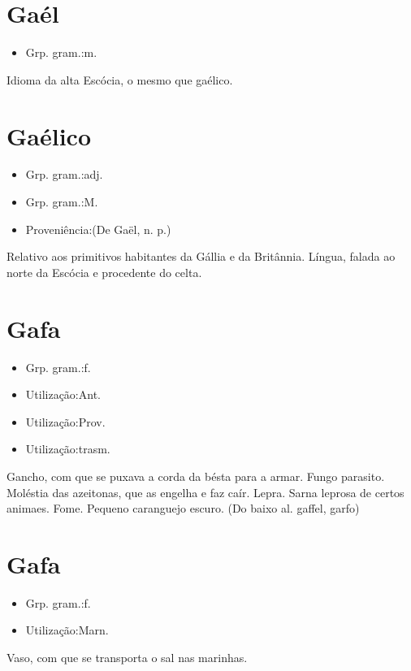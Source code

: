 \section{Gaél}
\begin{itemize}
\item {Grp. gram.:m.}
\end{itemize}
Idioma da alta Escócia, o mesmo que \textunderscore gaélico\textunderscore .
\section{Gaélico}
\begin{itemize}
\item {Grp. gram.:adj.}
\end{itemize}
\begin{itemize}
\item {Grp. gram.:M.}
\end{itemize}
\begin{itemize}
\item {Proveniência:(De \textunderscore Gaël\textunderscore , n. p.)}
\end{itemize}
Relativo aos primitivos habitantes da Gállia e da Britânnia.
Língua, falada ao norte da Escócia e procedente do celta.
\section{Gafa}
\begin{itemize}
\item {Grp. gram.:f.}
\end{itemize}
\begin{itemize}
\item {Utilização:Ant.}
\end{itemize}
\begin{itemize}
\item {Utilização:Prov.}
\end{itemize}
\begin{itemize}
\item {Utilização:trasm.}
\end{itemize}
Gancho, com que se puxava a corda da bésta para a armar.
Fungo parasito.
Moléstia das azeitonas, que as engelha e faz caír.
Lepra.
Sarna leprosa de certos animaes.
Fome.
Pequeno caranguejo escuro.
(Do baixo al. \textunderscore gaffel\textunderscore , garfo)
\section{Gafa}
\begin{itemize}
\item {Grp. gram.:f.}
\end{itemize}
\begin{itemize}
\item {Utilização:Marn.}
\end{itemize}
Vaso, com que se transporta o sal nas marinhas.
